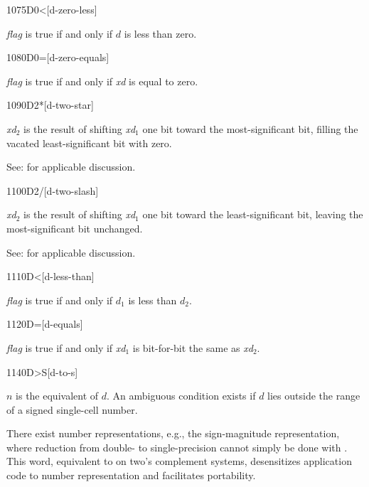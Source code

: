 \begin{newword}[D0less]{1075}{D0<}[d-zero-less]

	\emph{flag} is true if and only if $d$ is less than zero.
\end{newword}


\begin{newword}{1080}{D0=}[d-zero-equals]

	\emph{flag} is true if and only if \emph{xd} is equal to zero.
\end{newword}


\begin{newword}{1090}{D2*}[d-two-star]

	\emph{xd}$_2$ is the result of shifting \emph{xd}$_1$ one bit
	toward the most-significant bit, filling the vacated
	least-significant bit with zero.

	\begin{rationale} %
		See:  for applicable discussion.
	\end{rationale}
\end{newword}


\begin{newword}{1100}{D2/}[d-two-slash]

	\emph{xd}$_2$ is the result of shifting \emph{xd}$_1$ one bit
	toward the least-significant bit, leaving the most-significant
	bit unchanged.

	\begin{rationale} %
		See:  for applicable discussion.
	\end{rationale}
\end{newword}


\begin{newword}[Dless]{1110}{D<}[d-less-than]

	\emph{flag} is true if and only if $d_1$ is less than $d_2$.
\end{newword}


\begin{newword}{1120}{D=}[d-equals]

	\emph{flag} is true if and only if \emph{xd}$_1$ is bit-for-bit
	the same as \emph{xd}$_2$.
\end{newword}


\begin{newword}[DtoS]{1140}{D>S}[d-to-s]

	$n$ is the equivalent of $d$. An ambiguous condition exists if
	$d$ lies outside the range of a signed single-cell number.

	\begin{rationale} %
		There exist number representations, e.g., the sign-magnitude
		representation, where reduction from double- to single-precision
		cannot simply be done with . This word,
		equivalent to  on two's complement systems,
		desensitizes application code to number representation and
		facilitates portability.
	\end{rationale}
\end{newword}


